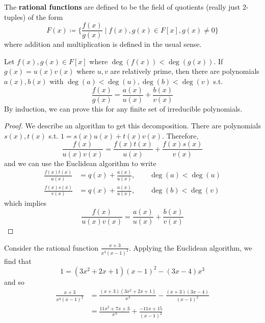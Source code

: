   \begin{definition}
    The \textbf{rational functions} are defined to be the field of quotients (really just 2-tuples) of the form 
    \begin{equation}
      F(x) \coloneqq \bigg\{ \frac{f(x)}{g(x)} \; \bigg| \; f(x), g(x) \in F[x], g(x) \neq 0 \bigg\}
    \end{equation}
    where addition and multiplication is defined in the usual sense.
  \end{definition}

  \begin{theorem}
    Let $f(x), g(x) \in F[x]$ where $\deg(f(x)) < \deg(g(x))$. If $g(x) = u(x) v(x)$ where $u, v$ are relatively prime, then there are polynomials $a(x), b(x)$ with $\deg(a) < \deg(u), \deg(b) < \deg(v)$ s.t. 
    \begin{equation}
      \frac{f(x)}{g(x)} = \frac{a(x)}{u(x)} + \frac{b(x)}{v(x)}
    \end{equation}
    By induction, we can prove this for any finite set of irreducible polynomials. 
  \end{theorem}
  \begin{proof}
    We describe an algorithm to get this decomposition. There are polynomials $s(x), t(x)$ s.t. $1 = s(x) u(x) + t(x) v(x)$. Therefore, 
    \begin{equation}
      \frac{f(x)}{ u(x) v(x)} = \frac{f(x) t(x)}{u(x)} + \frac{f(x) s(x)}{v(x)}
    \end{equation}
    and we can use the Euclidean algorithm to write 
    \begin{align}
      \frac{f(x) t(x)}{u(x)} & = q(x) + \frac{a(x)}{u(x)}, \qquad \deg(a) < \deg(u) \\
      \frac{f(x) s(x)}{v(x)} & = q(x) + \frac{a(x)}{u(x)}, \qquad \deg(b) < \deg(v)
    \end{align}
    which implies 
    \begin{equation}
      \frac{f(x)}{u(x) v(x)} = \frac{a(x)}{u(x)} + \frac{b(x)}{v(x)}
    \end{equation}
  \end{proof}

  \begin{example}
    Consider the rational function $\frac{x + 3}{x^3 (x - 1)^2}$. Applying the Euclidean algorithm, we find that 
    \begin{equation}
      1 = (3x^2 + 2x + 1) (x - 1)^2 - (3x - 4) x^3
    \end{equation}
    and so 
    \begin{align}
      \frac{x + 3}{x^3 (x - 1)^2} & = \frac{(x + 3)(3x^2 + 2x + 1)}{x^3} - \frac{(x + 3)(3x - 4)}{(x - 1)^2} \\
                                  & = \frac{11x^2 + 7x + 3}{x^3} + \frac{-11x + 15}{(x - 1)^2}
    \end{align}
  \end{example}
